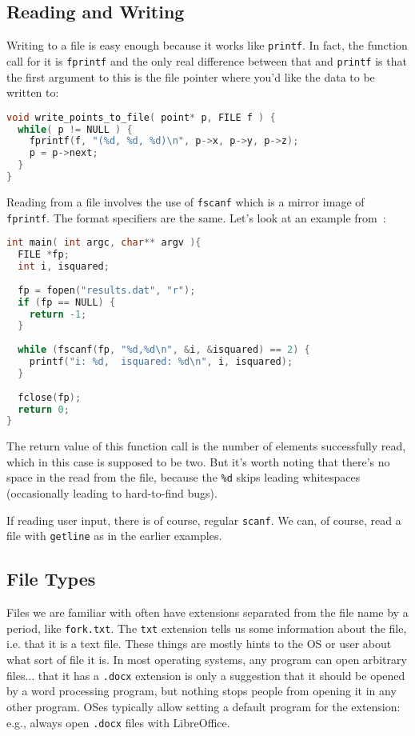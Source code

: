 \subsection*{Reading and Writing}

Writing to a file is easy enough because it works like \texttt{printf}. In fact, the function call for it is \texttt{fprintf} and the only real difference between that and \texttt{printf} is that the first argument to this is the file pointer where you'd like the data to be written to:

\begin{lstlisting}[language=C]
void write_points_to_file( point* p, FILE f ) {
  while( p != NULL ) {
    fprintf(f, "(%d, %d, %d)\n", p->x, p->y, p->z);
    p = p->next;
  }
}
\end{lstlisting}

Reading from a file involves the use of \texttt{fscanf} which is a mirror image of \texttt{fprintf}. The format specifiers are the same. Let's look at an example from~\cite{cfiles}:

\begin{lstlisting}[language=C]
int main( int argc, char** argv ){
  FILE *fp;
  int i, isquared;
   
  fp = fopen("results.dat", "r");
  if (fp == NULL) {
    return -1;
  }
   
  while (fscanf(fp, "%d,%d\n", &i, &isquared) == 2) {
    printf("i: %d,  isquared: %d\n", i, isquared);
  }
  
  fclose(fp);
  return 0;
}
\end{lstlisting}

The return value of this function call is the number of elements successfully read, which in this case is supposed to be two. But it's worth noting that there's no space in the read from the file, because the \texttt{\%d} skips leading whitespaces (occasionally leading to hard-to-find bugs).

If reading user input, there is of course, regular \texttt{scanf}. We can, of course, read a file with \texttt{getline} as in the earlier examples. 

\subsection*{File Types}

Files we are familiar with often have extensions separated from the file name by a period, like \texttt{fork.txt}. The \texttt{txt} extension tells us some information about the file, i.e. that it is a text file. These things are mostly hints to the OS or user about what sort of file it is. In most operating systems, any program can open arbitrary files... that it has a \texttt{.docx} extension is only a suggestion that it should be opened by a word processing program, but nothing stops people from opening it in any other program. OSes typically allow setting a default program for the extension: e.g., always open \texttt{.docx} files with LibreOffice.

